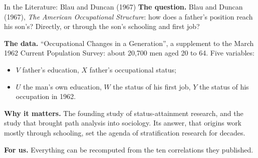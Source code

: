 \documentclass[aspectratio=169,11pt,xcolor=dvipsnames]{beamer}
\begin{document}
\begin{frame}{In the Literature: Blau and Duncan (1967)}
\textbf{The question.} Blau and Duncan (1967), \textit{The American Occupational Structure}: how
does a father's position reach his son's? Directly, or through the son's schooling and first job?
\par\vskip3pt
\textbf{The data.} ``Occupational Changes in a Generation'', a supplement to the March 1962 Current
Population Survey: about 20,700 men aged 20 to 64. Five variables:
\begin{itemize}\itemsep1pt
  \item $V$ father's education, $X$ father's occupational status;
  \item $U$ the man's own education, $W$ the status of his first job, $Y$ the status of his
        occupation in 1962.
\end{itemize}
\textbf{Why it matters.} The founding study of status-attainment research, and the study that
brought path analysis into sociology. Its answer, that origins work mostly through schooling,
set the agenda of stratification research for decades.
\par\vskip3pt
\textbf{For us.} Everything can be recomputed from the ten correlations they published.
\end{frame}
\end{document}
